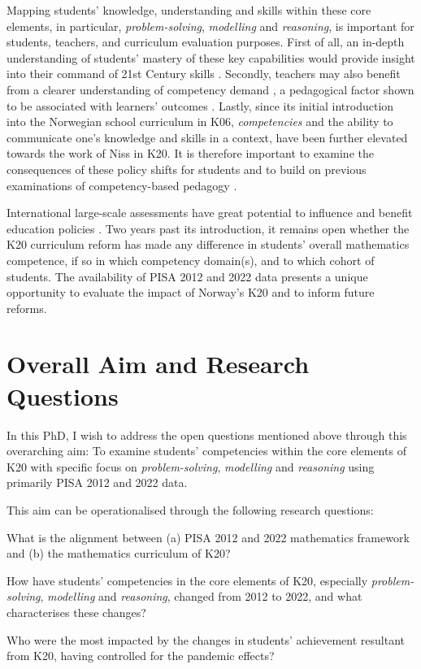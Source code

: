 \documentclass[
    a4paper,                %
    11pt,                   %
    stu,                    %
    donotrepeattitle,       %
    floatsintext,           %
    biblatex,               %
    colorlinks=true,        %
    linkcolor=red,          %
    anchorcolor=black,      %
    citecolor=blue,         %
    urlcolor=blue,          %
    bookmarks=true,         %
    bookmarksopen=false,    %
    bookmarksnumbered=true, %
    dvipsnames              %
]{apa7}
\begin{document}
Mapping students' knowledge, understanding and skills within these core elements, in particular, \emph{problem-solving}, \emph{modelling} and \emph{reasoning}, is important for students, teachers, and curriculum evaluation purposes. First of all, an in-depth understanding of students' mastery of these key capabilities would provide insight into their command of 21st Century skills \parencite[][p. 31]{oecd:2018}. Secondly, teachers may also benefit from a clearer understanding of competency demand \parencite{pettersen:2018}, a pedagogical factor shown to be associated with learners' outcomes \parencite{pettersen:2019}. Lastly, since its initial introduction into the Norwegian school curriculum in K06, \emph{competencies} and the ability to communicate one's knowledge and skills in a context, have been further elevated towards the work of Niss in K20. It is therefore important to examine the consequences of these policy shifts for students and to build on previous examinations of competency-based pedagogy \parencite[e.g., ][]{pettersen:2018}.


International large-scale assessments have great potential to influence and benefit education policies \parencite{nortvedt:2018}. Two years past its introduction, it remains open whether the K20 curriculum reform has made any difference in students' overall mathematics competence, if so in which competency domain(s), and to which cohort of students. The availability of PISA 2012 and 2022 data presents a unique opportunity to evaluate the impact of Norway's K20 and to inform future reforms.

\section{Overall Aim and Research Questions}

In this PhD, I wish to address the open questions mentioned above through this overarching aim: To examine students' competencies within the core elements of K20 with specific focus on \textit{problem-solving}, \textit{modelling} and \textit{reasoning} using primarily PISA 2012 and 2022 data.

This aim can be operationalised through the following research questions:
\begin{APAenumerate}
    \item What is the alignment between (a) PISA 2012 and 2022 mathematics framework and (b) the mathematics curriculum of K20?
    \item How have students' competencies in the core elements of K20, especially \emph{problem-solving}, \emph{modelling} and \emph{reasoning}, changed from  2012 to 2022, and what characterises these changes?
    \item Who were the most impacted by the changes in students' achievement resultant from K20, having controlled for the pandemic effects?
\end{APAenumerate}
\end{document}
